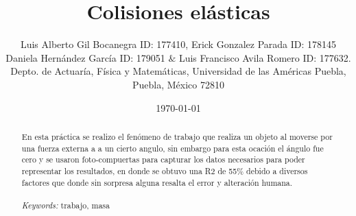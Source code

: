 \documentclass{article}
\begin{document}

\renewcommand{\footrulewidth}{1pt}
\renewcommand{\tablename}{Tabla}
\renewcommand{\figurename}{Figura}


\title{Colisiones elásticas}
\author{\small{Luis Alberto Gil Bocanegra ID: 177410, Erick Gonzalez Parada ID: 178145}\\
 \small{Daniela Hernández García ID: 179051 $\&$ Luis Francisco Avila Romero ID: 177632.}\\		%
	   \small{Depto. de Actuaría, Física y Matemáticas, Universidad de las Américas Puebla, Puebla, M\'exico 72810}}
\date{\small{\today}}

\maketitle


\begin{abstract}
En esta práctica se realizo el fenómeno de trabajo que realiza un objeto al moverse por una fuerza externa a a un cierto angulo, sin embargo para esta ocación
el ángulo fue cero y se usaron foto-compuertas para capturar los datos necesarios para poder representar los resultados, en donde se obtuvo una R2 de 55$\%$ debido a diversos factores que donde sin sorpresa alguna resalta el error y alteración humana.    
\\
\\
{\it Keywords:}  trabajo, masa  
\\
\\
\end{abstract}
\end{document}
